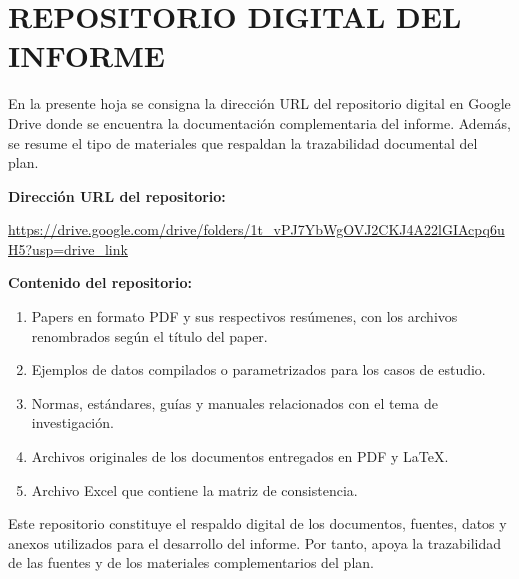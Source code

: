 
\section{REPOSITORIO DIGITAL DEL INFORME}

En la presente hoja se consigna la dirección URL del repositorio digital en Google Drive donde se encuentra la documentación complementaria del informe. Además, se resume el tipo de materiales que respaldan la trazabilidad documental del plan.

\vspace{0.5cm}

\noindent\textbf{Dirección URL del repositorio:}

\vspace{0.3cm}

\noindent
\url{https://drive.google.com/drive/folders/1t_vPJ7YbWgOVJ2CKJ4A22lGIAcpq6uH5?usp=drive_link}

\vspace{0.8cm}

\noindent\textbf{Contenido del repositorio:}

\begin{enumerate}
    \item Papers en formato PDF y sus respectivos resúmenes, con los archivos renombrados según el título del paper.
    
    \item Ejemplos de datos compilados o parametrizados para los casos de estudio.
    
    \item Normas, estándares, guías y manuales relacionados con el tema de investigación.
    
    \item Archivos originales de los documentos entregados en PDF y \LaTeX.
    
    \item Archivo Excel que contiene la matriz de consistencia.
\end{enumerate}

\vfill

\noindent
Este repositorio constituye el respaldo digital de los documentos, fuentes, datos y anexos utilizados para el desarrollo del informe. Por tanto, apoya la trazabilidad de las fuentes y de los materiales complementarios del plan.




